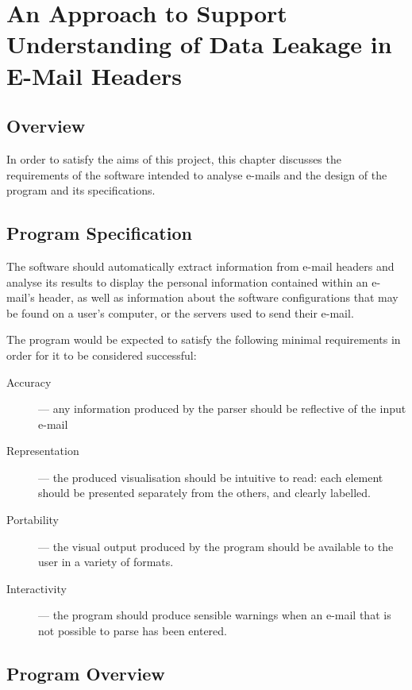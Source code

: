 \chapter{An Approach to Support Understanding of Data Leakage in E-Mail Headers}\label{chap:des}

\section{Overview}

In order to satisfy the aims of this project, this chapter discusses the
requirements of the software intended to analyse e-mails and the design of the
program and its specifications.

\section{Program Specification}

The software should automatically extract information from e-mail headers and
analyse its results to display the personal information contained within an
e-mail's header, as well as information about the software configurations that
may be found on a user's computer, or the servers used to send their e-mail.

The program would be expected to satisfy the following minimal requirements in
order for it to be considered successful: 

\begin{description} 
	
\item [{Accuracy}] --- any information produced by the parser should be
	reflective of the input e-mail

\item [{Representation}] --- the produced visualisation should be intuitive to
	read: each element should be presented separately from the others, and
	clearly labelled.

\item [{Portability}] --- the visual output produced by the program should be
	available to the user in a variety of formats.

\item [{Interactivity}] --- the program should produce sensible warnings when
	an e-mail that is not possible to parse has been entered.

\end{description}

\section{Program Overview}

